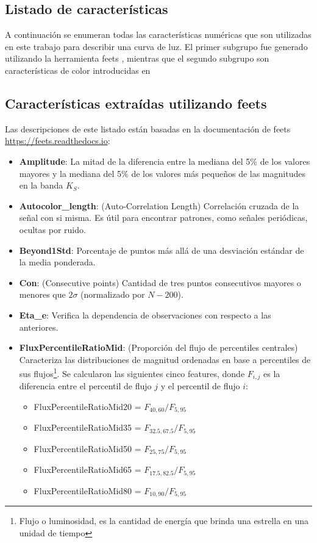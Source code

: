 \begin{appendix}
\chapter{Listado de características}\label{AnexoA}
A continuación se enumeran todas las características numéricas que son utilizadas en este trabajo para describir una curva de luz. El primer subgrupo fue generado utilizando la herramienta feets \cite{cabral2018fats}, mientras que el segundo subgrupo son características de color introducidas en \cite{jbc}

\section{Características extraídas utilizando feets}
Las descripciones de este listado están basadas en la documentación de feets \url{https://feets.readthedocs.io}:

\begin{itemize}
\item \textbf{Amplitude}: La mitad de la diferencia entre la mediana del 5\% de los valores mayores y la mediana del 5\% de los valores más pequeños de las magnitudes en la banda $K_S$.

\item \textbf{Autocolor\_length}: (Auto-Correlation Length) Correlación cruzada de la señal con si misma. Es útil para encontrar patrones, como señales periódicas, ocultas por ruido.

\item \textbf{Beyond1Std}: Porcentaje de puntos más allá de una desviación estándar de la media ponderada.

\item \textbf{Con}: (Consecutive points) Cantidad de tres puntos consecutivos mayores o menores que $2\sigma$ (normalizado por  $N-200$). 

\item \textbf{Eta\_e}: Verifica la dependencia de  observaciones con respecto a las anteriores.

\item \textbf{FluxPercentileRatioMid}: (Proporción del flujo de percentiles centrales) Caracteriza las distribuciones de magnitud ordenadas en base a percentiles de sus flujos\footnote{Flujo o luminosidad, es la cantidad de energía que brinda una estrella en una unidad de tiempo}. Se calcularon las siguientes cinco features, donde $F_{i,j}$ es la diferencia entre el percentil de flujo $j$ y el percentil de flujo $i$:
	\begin{itemize}
	\item FluxPercentileRatioMid20 = $F_{40,60} / F_{5,95}$
	\item FluxPercentileRatioMid35 = $F_{32.5,67.5} / F_{5,95}$
	\item FluxPercentileRatioMid50 = $F_{25,75} / F_{5,95}$
	\item FluxPercentileRatioMid65 = $F_{17.5,82.5} / F_{5,95}$
	\item FluxPercentileRatioMid80 = $F_{10,90} / F_{5,95}$
	\end{itemize}


\end{itemize}
\end{appendix}
